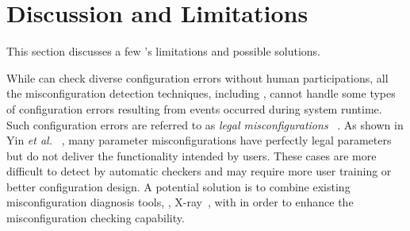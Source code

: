 
\section{Discussion and Limitations}


This section discusses a few \app's limitations
and possible solutions.

While \app can check diverse configuration errors without
human participations, all the misconfiguration detection techniques,
including \app, cannot handle some types of configuration errors
resulting from events occurred during system runtime.
Such configuration errors are referred to as {\em legal misconfigurations}%
~\cite{yin11anempirical}. As shown in Yin {\em et al.}%
~\cite{yin11anempirical}, many parameter misconfigurations have 
perfectly legal parameters but do not deliver the functionality intended
by users. These cases are more difficult to detect by
automatic checkers and may require more user training or
better configuration design.
A potential solution is to combine existing misconfiguration diagnosis
tools, \eg, X-ray~\cite{}, with \app in order to enhance the 
misconfiguration checking capability.

\para{} 
